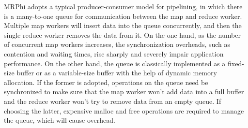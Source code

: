 MRPhi adopts a typical producer-consumer model for pipelining, in which there is a many-to-one queue for communication between the map and reduce worker. 
Multiple map workers will insert data into the queue concurrently, and then the single reduce worker removes the data from it. 
On the one hand, as the number of concurrent map workers increases, the synchronization overheads, such as contention and waiting times, rise sharply and severely impair application performance. 
On the other hand, the queue is classically implemented as a fixed-size buffer or as a variable-size buffer with the help of dynamic memory allocation.
If the former is adopted, operations on the queue need be synchronized to make sure that the map worker won't add data into a full buffer and the reduce worker won't try to remove data from an empty queue.
If choosing the latter, expensive malloc and free operations are required to manage the queue, which will cause overhead.












